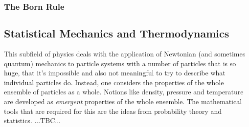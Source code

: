 

\subsubsection{The Born Rule}











\subsection{Statistical Mechanics and Thermodynamics}
This subfield of physics deals with the application of Newtonian (and sometimes quantum) mechanics to particle systems with a number of particles that is so huge, that it's impossible and also not meaningful to try to describe what individual particles do. Instead, one considers the properties of the whole ensemble of particles as a whole. Notions like density, pressure and temperature are developed as \emph{emergent} properties of the whole ensemble. The mathematical tools that are required for this are the ideas from probability theory and statistics. ...TBC...



